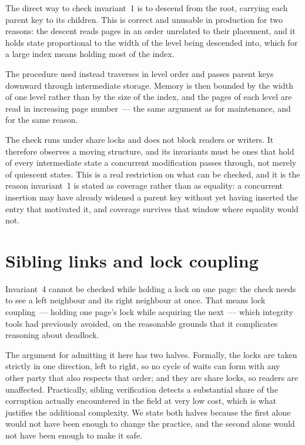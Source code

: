 The direct way to check invariant~1 is to descend from the root, carrying each
parent key to its children. This is correct and unusable in production for two
reasons: the descent reads pages in an order unrelated to their placement, and it
holds state proportional to the width of the level being descended into, which
for a large index means holding most of the index.

The procedure used instead traverses in level order and passes parent keys
downward through intermediate storage. Memory is then bounded by the width of one
level rather than by the size of the index, and the pages of each level are read
in increasing page number~--- the same argument as for maintenance, and for the
same reason.

The check runs under share locks and does not block readers or writers. It
therefore observes a moving structure, and its invariants must be ones that hold
of every intermediate state a concurrent modification passes through, not merely
of quiescent states. This is a real restriction on what can be checked, and it is
the reason invariant~1 is stated as coverage rather than as equality: a
concurrent insertion may have already widened a parent key without yet having
inserted the entry that motivated it, and coverage survives that window where
equality would not.

\section{Sibling links and lock coupling}
\label{sec:siblings}

Invariant~4 cannot be checked while holding a lock on one page: the check needs
to see a left neighbour and its right neighbour at once. That means lock
coupling~--- holding one page's lock while acquiring the next~--- which integrity
tools had previously avoided, on the reasonable grounds that it complicates
reasoning about deadlock.

The argument for admitting it here has two halves. Formally, the locks are taken
strictly in one direction, left to right, so no cycle of waits can form with any
other party that also respects that order; and they are share locks, so readers
are unaffected. Practically, sibling verification detects a substantial share of
the corruption actually encountered in the field at very low cost, which is what
justifies the additional complexity. We state both halves because the first alone
would not have been enough to change the practice, and the second alone would not
have been enough to make it safe.

